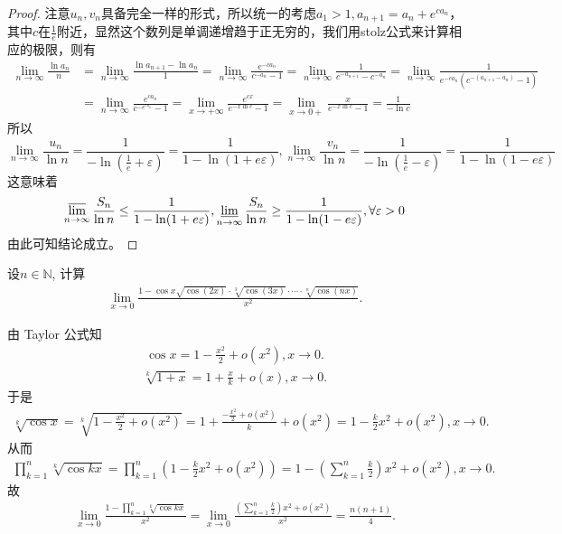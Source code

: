 \documentclass[../../main.tex]{subfiles}
\begin{document}
\begin{proof}
注意\(u_n,v_n\)具备完全一样的形式，所以统一的考虑\(a_1>1,a_{n + 1}=a_n + e^{ca_n}\)，其中\(c\)在\(\frac{1}{e}\)附近，显然这个数列是单调递增趋于正无穷的，我们用stolz公式来计算相应的极限，则有
\begin{align*}
\lim_{n\rightarrow\infty}\frac{\ln a_n}{n}&=\lim_{n\rightarrow\infty}\frac{\ln a_{n + 1}-\ln a_n}{1}=\lim_{n\rightarrow\infty}\frac{e^{-ca_n}}{c^{-a_n}-1}=\lim_{n\rightarrow\infty}\frac{1}{c^{-a_{n + 1}}-c^{-a_n}}=\lim_{n\rightarrow\infty}\frac{1}{e^{-ca_n}(c^{-(a_{n + 1}-a_n)}-1)}\\
&=\lim_{n\rightarrow\infty}\frac{e^{ca_n}}{c^{-e^{ca_n}}-1}=\lim_{x\rightarrow+\infty}\frac{e^{cx}}{e^{-x\ln c}-1}=\lim_{x\rightarrow0+}\frac{x}{e^{-x\ln c}-1}=\frac{1}{-\ln c}
\end{align*}
所以
\[\lim_{n\rightarrow\infty}\frac{u_n}{\ln n}=\frac{1}{-\ln(\frac{1}{e}+\varepsilon)}=\frac{1}{1-\ln(1 + e\varepsilon)},\lim_{n\rightarrow\infty}\frac{v_n}{\ln n}=\frac{1}{-\ln(\frac{1}{e}-\varepsilon)}=\frac{1}{1-\ln(1 - e\varepsilon)}\]
这意味着
\[\varlimsup_{n\rightarrow\infty}\frac{S_n}{\ln n}\leq\frac{1}{1-\ln(1 + e\varepsilon)},\varliminf_{n\rightarrow\infty}\frac{S_n}{\ln n}\geq\frac{1}{1-\ln(1 - e\varepsilon)},\forall\varepsilon>0\]
由此可知结论成立。
\end{proof}

\begin{example}
设$n \in \mathbb{N}$, 计算
\begin{align*}
\lim_{x \to 0} \frac{1 - \cos x \sqrt{\cos (2x)} \cdot \sqrt[3]{\cos (3x)} \cdot \cdots \cdot \sqrt[n]{\cos (nx)}}{x^2}.
\end{align*}
\end{example}
\begin{solution}
由 Taylor 公式知
\begin{align*}
\cos x = 1 - \frac{x^2}{2} + o(x^2), x \to 0.
\end{align*}
\begin{align*}
\sqrt[k]{1 + x} = 1 + \frac{x}{k} + o(x), x \to 0.
\end{align*}
于是
\begin{align*}
\sqrt[k]{\cos x} = \sqrt[k]{1 - \frac{x^2}{2} + o(x^2)} = 1 + \frac{-\frac{x^2}{2} + o(x^2)}{k} + o(x^2) = 1 - \frac{k}{2}x^2 + o(x^2), x \to 0.
\end{align*}
从而
\begin{align*}
\prod_{k=1}^n \sqrt[k]{\cos kx} = \prod_{k=1}^n \left( 1 - \frac{k}{2}x^2 + o(x^2) \right) = 1 - \left( \sum_{k=1}^n \frac{k}{2} \right) x^2 + o(x^2), x \to 0.
\end{align*}
故
\begin{align*}
\lim_{x \to 0} \frac{1 - \prod\limits_{k=1}^n \sqrt[k]{\cos kx}}{x^2} = \lim_{x \to 0} \frac{\left( \sum\limits_{k=1}^n \frac{k}{2} \right) x^2 + o(x^2)}{x^2} = \frac{n(n + 1)}{4}.
\end{align*}
\end{solution}
\end{document}
